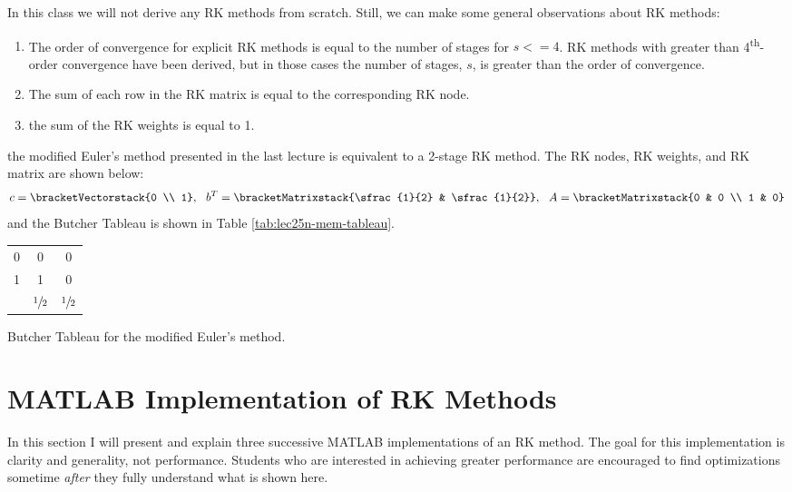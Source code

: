 In this class we will not derive any RK methods from scratch.  Still, we can make some general observations about RK methods:
\begin{enumerate}
\item The order of convergence for explicit RK methods is equal to the number of stages for $s<=4$.  RK methods with greater than 4\textsuperscript{th}-order convergence have been derived, but in those cases the number of stages, $s$, is greater than the order of convergence.

\item The sum of each row in the RK matrix is equal to the corresponding RK node.
\item the sum of the RK weights is equal to 1.
\end{enumerate}

 the modified Euler's method presented in the last lecture is equivalent to a 2-stage RK method. The RK nodes, RK weights, and RK matrix are shown below:
\begin{equation*}
c = \bracketVectorstack{0 \\ 1}, \ \ b^{T} = \bracketMatrixstack{\sfrac{1}{2} & \sfrac{1}{2}}, \ \ A = \bracketMatrixstack{0 & 0 \\ 1 & 0}
\end{equation*}
and the Butcher Tableau is shown in Table \ref{tab:lec25n-mem-tableau}.
\begin{margintable}
\begin{tabular}{c|cc}
0 & 0 & 0 \\
1 & 1 & 0 \\ \hline
  & $\sfrac{1}{2}$ & $\sfrac{1}{2}$ \\
\end{tabular}
\caption{Butcher Tableau for the modified Euler's method.}
\label{tab:lec25n-mem-tableau}
\end{margintable}

\section{MATLAB Implementation of RK Methods}

In this section I will present and explain three successive MATLAB implementations of an RK method.  The goal for this implementation is clarity and generality, not performance.  Students who are interested in achieving greater performance are encouraged to find optimizations sometime \emph{after} they fully understand what is shown here.

